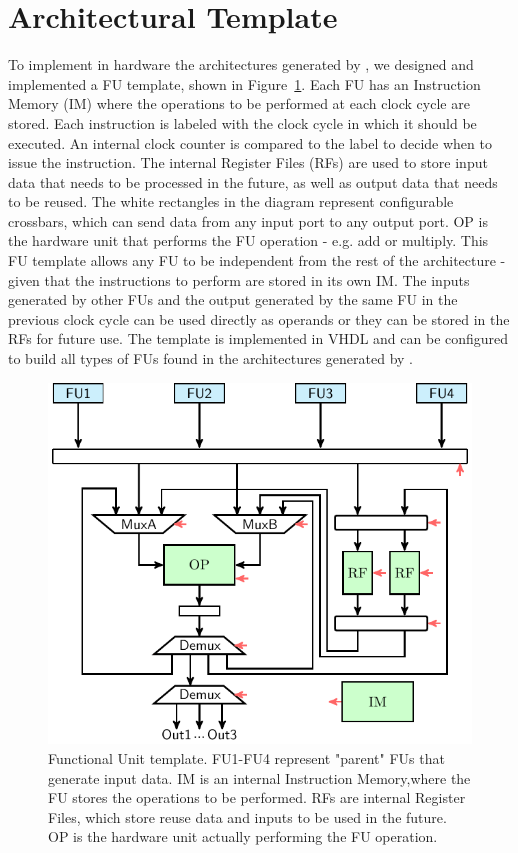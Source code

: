 \vspace{-2mm}
\section{Architectural Template}
\label{sec:arch_template}
To implement in hardware the architectures generated by \frameworkname, we designed and implemented a FU template, shown in Figure~\ref{fig:FU_templ}. Each FU has an Instruction Memory (IM) where the operations to be performed at each clock cycle are stored. Each instruction is labeled with the clock cycle in which it should be executed. An internal clock counter is compared to the label to decide when to issue the instruction. The internal Register Files (RFs) are used to store input data that needs to be processed in the future, as well as output data that needs to be reused. The white rectangles in the diagram represent configurable crossbars, which can send data from any input port to any output port. OP is the hardware unit that performs the FU operation - e.g. add or multiply. 
This FU template allows any FU to be independent from the rest of the architecture - given that the instructions to perform are stored in its own IM. The inputs generated by other FUs and the output generated by the same FU in the previous clock cycle can be used directly as operands or they can be stored in the RFs for future use. 
The template is implemented in VHDL and can be configured to build all types of FUs found in the architectures generated by \frameworkname.

\begin{figure}[tb] 
\centering
\includegraphics[width=.7\columnwidth]{images/functional_unit.pdf}
    \caption{\small Functional Unit template. FU1-FU4 represent "parent" FUs that generate input data. IM is an internal Instruction Memory,where the FU stores the operations to be performed. RFs are internal Register Files, which store reuse data and inputs to be used in the future. OP is the hardware unit actually performing the FU operation.}
\label{fig:FU_templ}
\end{figure}


